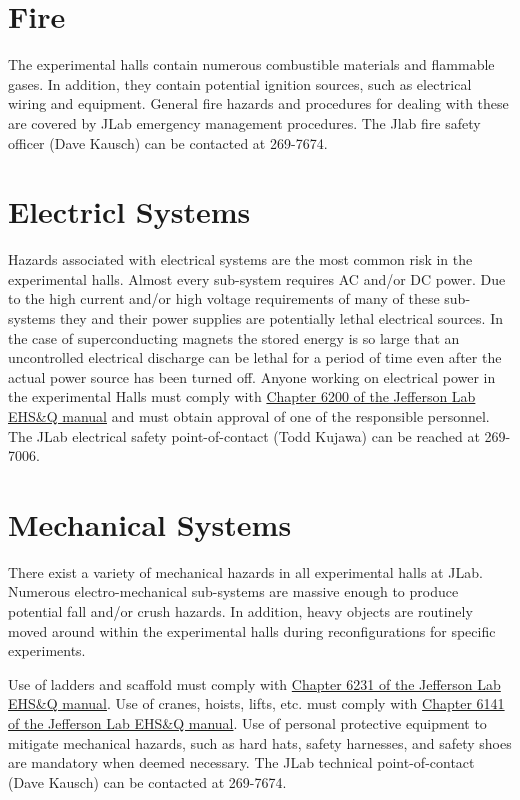 \section{Fire}

	The experimental halls contain numerous combustible materials and flammable gases. 
In addition, they contain potential ignition sources, such as electrical wiring and equipment. 
General fire hazards and procedures for dealing with these are covered by JLab emergency 
management procedures. The Jlab fire safety officer (Dave Kausch) can be contacted at 269-7674.

\section{Electricl Systems}

	Hazards associated with electrical systems are the most common risk in the experimental halls. 
Almost every sub-system requires AC and/or DC power. Due to the high current and/or high voltage 
requirements of many of these sub-systems they and their power supplies are potentially lethal 
electrical sources. In the case of superconducting magnets the stored energy is so large that 
an uncontrolled electrical discharge can be lethal for a period of time even after the actual 
power source has been turned off.  Anyone working on electrical power in the experimental Halls 
must comply with \href{http://www.jlab.org/ehs/ehsmanual/manual/6200.html}{Chapter 6200 of the Jefferson Lab EHS\&Q manual}
and must obtain approval of one of the responsible personnel. 
The JLab electrical safety point-of-contact (Todd Kujawa) can be reached at 269-7006.

\section{Mechanical Systems}

	There exist a variety of mechanical hazards in all experimental halls at JLab. 
Numerous electro-mechanical sub-systems are massive enough to produce potential fall 
and/or crush hazards.  In addition, heavy objects are routinely moved around within 
the experimental halls during reconfigurations for specific experiments. 

Use of ladders and scaffold must comply 
with \href{http://www.jlab.org/ehs/ehsmanual/manual/6132.html}{Chapter 6231 of the 
Jefferson Lab EHS\&Q manual}.
Use of cranes, hoists, lifts, etc. must comply with
\href{http://www.jlab.org/ehs/ehsmanual/manual/6141.html}{Chapter 6141 of the 
Jefferson Lab EHS\&Q manual}. 
Use of personal protective equipment 
to mitigate mechanical hazards, such as hard hats, safety harnesses, and safety 
shoes are mandatory when deemed necessary.
The JLab technical point-of-contact (Dave Kausch) can be contacted at 269-7674.


